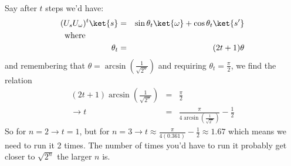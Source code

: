 \documentclass[preprint,aps,prd,nofootinbib,superscriptaddress]{revtex4-2}
\begin{document}
%
Say after $t$ steps we'd have:
%
\begin{eqnarray}
(U_s U_\omega)^t \ket{s} &=& \sin\theta_t \ket{\omega} + \cos\theta_t \ket{s^\prime}
\nonumber \\
\text{where}\quad \quad \quad \quad &&
\nonumber \\
\theta_t &=& (2t + 1) \theta
\end{eqnarray}
%
and remembering that $\theta = \arcsin\left(\frac{1}{\sqrt{2^n}}\right)$ and requiring $\theta_t = \frac{\pi}{2}$, we find the relation
%
\begin{eqnarray}
(2t + 1) \arcsin\left(\frac{1}{\sqrt{2^n}}\right) &=& \frac{\pi}{2}
\nonumber \\
\rightarrow t &=& \frac{\pi}{4\arcsin\left(\frac{1}{\sqrt{2^n}}\right)} - \frac{1}{2}
\end{eqnarray}
%
So for $n=2 \rightarrow t=1$, but for $n=3 \rightarrow t \approx \frac{\pi}{4(0.361)} - \frac{1}{2} \approx 1.67$ which means we need to run it 2 times. The number of times you'd have to run it probably get closer to $\sqrt{2^n}$ the larger $n$ is.

\end{document}
